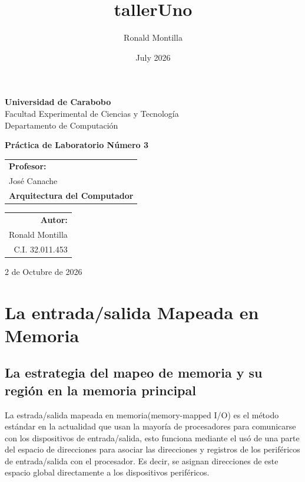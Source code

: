 \documentclass[12pt, a4paper]{article}
\title{tallerUno}
\author{Ronald Montilla}
\date{July 2026}
\begin{document}
\begin{titlepage}
    \centering %

    {\bfseries\LARGE Universidad de Carabobo} \\[0.4cm]
    {\LARGE Facultad Experimental de Ciencias y Tecnología} \\[0.2cm]
    {\LARGE Departamento de Computación} \\[1.5cm]
    

    
    \vfill

    {\bfseries\Huge Práctica de Laboratorio Número 3} \\[0.5cm]
    
    \vfill
    
    \vfill
    \begin{tabular}[t]{l}
        \large\textbf{Profesor:} \\
        \large José Canache \\
        \large\textbf{Arquitectura del Computador}
    \end{tabular}
    \hfill
    \begin{tabular}[t]{r}
        \large\textbf{Autor:} \\
        \large Ronald Montilla \\
        \large C.I. 32.011.453
    \end{tabular}

    {2 de Octubre de 2026}
    
\end{titlepage}
\newpage 
\tableofcontents
\newpage
\section{La entrada/salida Mapeada en Memoria}
\subsection{La estrategia del mapeo de memoria y su región en la memoria principal}
La estrada/salida mapeada en memoria(memory-mapped I/O) es el método estándar en la actualidad que usan la mayoría de procesadores para comunicarse con los dispositivos de entrada/salida, esto funciona mediante el usó de una parte del espacio de direcciones para asociar las direcciones y registros de los periféricos de entrada/salida con el procesador. Es decir, se asignan direcciones de este espacio global directamente a los dispositivos periféricos.
\end{document}
